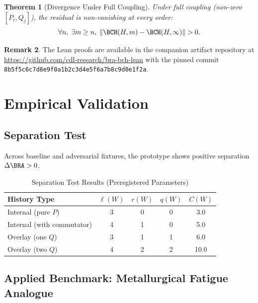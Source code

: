\documentclass[12pt]{article}
\theoremstyle{plain}
\newtheorem{theorem}{Theorem}[section]
\theoremstyle{definition}
\newtheorem{remark}[theorem]{Remark}
\theoremstyle{remark}
\begin{document}
\begin{theorem}[Divergence Under Full Coupling]
\statuslean
Under full coupling (non-zero $[P_i, Q_j]$), the residual is non-vanishing at every order:
\[
\forall n,\; \exists m \ge n,\; \|\BCH(H,m) - \BCH(H,\infty)\| > 0.
\]
\end{theorem}

\begin{remark}
The Lean proofs are available in the companion artifact repository at \url{https://github.com/cdl-research/bra-bch-lean} with the pinned commit \texttt{8b5f5c6c7d8e9f0a1b2c3d4e5f6a7b8c9d0e1f2a}.
\end{remark}

\section{Empirical Validation}

\subsection{Separation Test}

Across baseline and adversarial fixtures, the prototype shows positive separation $\Delta \BRA > 0$. 

\begin{table}[htbp]
\centering
\caption{Separation Test Results (Preregistered Parameters)}
\label{tab:separation}
\begin{tabular}{lcccc}
\toprule
\textbf{History Type} & $\ell(W)$ & $r(W)$ & $q(W)$ & $C(W)$ \\
\midrule
Internal (pure $P$) & 3 & 0 & 0 & 3.0 \\
Internal (with commutator) & 4 & 1 & 0 & 5.0 \\
Overlay (one $Q$) & 3 & 1 & 1 & 6.0 \\
Overlay (two $Q$) & 4 & 2 & 2 & 10.0 \\
\bottomrule
\end{tabular}
\end{table}


\subsection{Applied Benchmark: Metallurgical Fatigue Analogue}
\end{document}
